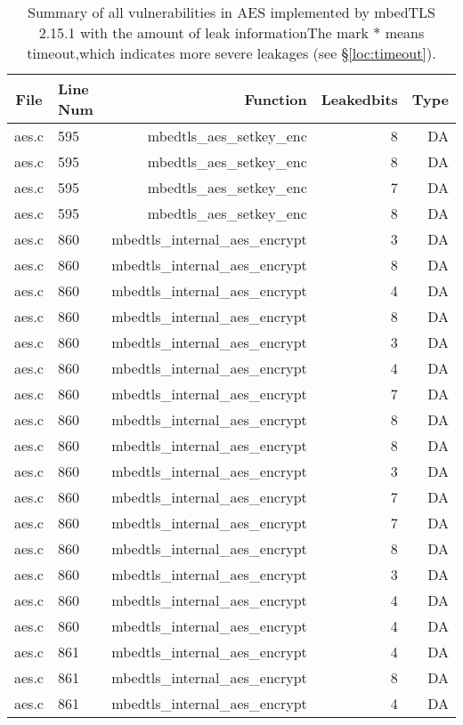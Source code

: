 \begin{table}%
\centering
\caption{Summary of all vulnerabilities in AES implemented by mbedTLS 2.15.1 with the amount of leak informationThe mark $*$ means timeout,which indicates more severe leakages (see \S\ref{loc:timeout}).}\label{tab:AESmbedTLS}
\begin{tabular}{clrrr}
\hline
\textbf{File} & \textbf{Line Num} & \textbf{Function} & \textbf{Leakedbits} & \textbf{Type} \\\hline
aes.c& 595&mbedtls\_aes\_setkey\_enc&8 &DA\\
aes.c& 595&mbedtls\_aes\_setkey\_enc&8 &DA\\
aes.c& 595&mbedtls\_aes\_setkey\_enc&7 &DA\\
aes.c& 595&mbedtls\_aes\_setkey\_enc&8 &DA\\
aes.c& 860&mbedtls\_internal\_aes\_encrypt&3 &DA\\
aes.c& 860&mbedtls\_internal\_aes\_encrypt&8 &DA\\
aes.c& 860&mbedtls\_internal\_aes\_encrypt&4 &DA\\
aes.c& 860&mbedtls\_internal\_aes\_encrypt&8 &DA\\
aes.c& 860&mbedtls\_internal\_aes\_encrypt&3 &DA\\
aes.c& 860&mbedtls\_internal\_aes\_encrypt&4 &DA\\
aes.c& 860&mbedtls\_internal\_aes\_encrypt&7 &DA\\
aes.c& 860&mbedtls\_internal\_aes\_encrypt&8 &DA\\
aes.c& 860&mbedtls\_internal\_aes\_encrypt&8 &DA\\
aes.c& 860&mbedtls\_internal\_aes\_encrypt&3 &DA\\
aes.c& 860&mbedtls\_internal\_aes\_encrypt&7 &DA\\
aes.c& 860&mbedtls\_internal\_aes\_encrypt&7 &DA\\
aes.c& 860&mbedtls\_internal\_aes\_encrypt&8 &DA\\
aes.c& 860&mbedtls\_internal\_aes\_encrypt&3 &DA\\
aes.c& 860&mbedtls\_internal\_aes\_encrypt&4 &DA\\
aes.c& 860&mbedtls\_internal\_aes\_encrypt&4 &DA\\
aes.c& 861&mbedtls\_internal\_aes\_encrypt&4 &DA\\
aes.c& 861&mbedtls\_internal\_aes\_encrypt&8 &DA\\
aes.c& 861&mbedtls\_internal\_aes\_encrypt&4 &DA\\

\end{tabular}
\end{table}
